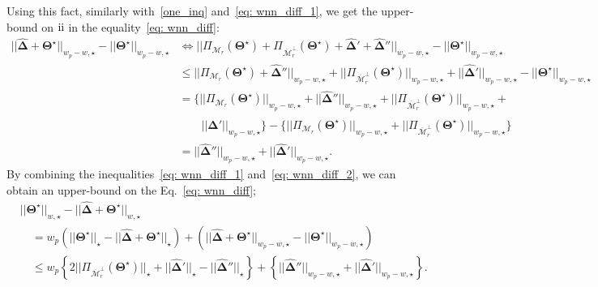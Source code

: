 \documentclass[alpha-refs]{wiley-article}
\newcommand{\RN}[1]{ \textup{\uppercase\expandafter{\romannumeral#1}} }
\begin{document}
Using this fact, similarly with~\eqref{one_inq} and~\eqref{eq: wnn_diff_1}, we get the upper-bound on $\RN{2}$ in the equality~\eqref{eq: wnn_diff}:
\begin{align}
||\boldsymbol{\widehat{\Delta}} + \boldsymbol{\Theta^{\star}}||_{w_{p} - w, \star} -  ||\boldsymbol{\Theta^{\star}}||_{w_{p} - w, \star}
 & \Leftrightarrow  ||\Pi_{\mathcal{M}_{r}}(\boldsymbol{\Theta^{\star}}) + \Pi_{\overline{\mathcal{M}}_{r}^{\perp}}(\boldsymbol{\Theta^{\star}}) + \boldsymbol{\widehat{\Delta}}' + \boldsymbol{\widehat{\Delta}}''||_{w_{p} - w, \star} - ||\boldsymbol{\Theta^{\star}}||_{w_{p} - w, \star} \nonumber\\
 & \leq ||\Pi_{\mathcal{M}_{r}}(\boldsymbol{\Theta^{\star}}) + \boldsymbol{\widehat{\Delta}}''||_{w_{p} - w, \star} + || \Pi_{\overline{\mathcal{M}}_{r}^{\perp}}(\boldsymbol{\Theta^{\star}}) ||_{w_{p} - w, \star} + ||\boldsymbol{\widehat{\Delta}}'||_{w_{p} - w, \star} - ||\boldsymbol{\Theta^{\star}}||_{w_{p} - w, \star} \nonumber\\
 & = \bigg\{ ||\Pi_{\mathcal{M}_{r}}(\boldsymbol{\Theta^{\star}})||_{w_{p} - w, \star} + || \boldsymbol{\widehat{\Delta}}''||_{w_{p} - w, \star}  + || \Pi_{\overline{\mathcal{M}}_{r}^{\perp}}(\boldsymbol{\Theta^{\star}}) ||_{w_{p} - w, \star} + \nonumber\\
 & \qquad ||\boldsymbol{\widehat{\Delta}}' ||_{w_{p} - w, \star} \bigg\}  - \bigg\{ ||\Pi_{\mathcal{M}_{r}}(\boldsymbol{\Theta^{\star}})||_{w_{p} - w, \star} + || \Pi_{\overline{\mathcal{M}}_{r}^{\perp}}(\boldsymbol{\Theta^{\star}}) ||_{w_{p} - w, \star} \bigg\} \nonumber\\
 & = ||\boldsymbol{\widehat{\Delta}}''||_{w_{p} - w, \star}  + ||\boldsymbol{\widehat{\Delta}}'||_{w_{p} - w, \star}. \label{eq: wnn_diff_2}
\end{align}
By combining the inequalities~\eqref{eq: wnn_diff_1} and~\eqref{eq: wnn_diff_2}, we can obtain an upper-bound on the Eq.~\eqref{eq: wnn_diff};
\begin{align}
    &||\boldsymbol{\Theta^{\star}}||_{w,\star} - ||\boldsymbol{\widehat{\Delta}} + \boldsymbol{\Theta^{\star}}||_{w,\star} \nonumber \\
    &\quad =   w_{p}(||\boldsymbol{\Theta^{\star}}||_{\star} - ||\boldsymbol{\widehat{\Delta}} + \boldsymbol{\Theta^{\star}}||_{\star}) + (||\boldsymbol{\widehat{\Delta}} + \boldsymbol{\Theta^{\star}}||_{w_{p}-w,\star} - ||\boldsymbol{\Theta^{\star}}||_{w_{p}-w,\star} )  \nonumber\\
    &\quad \leq  w_{p}\left\lbrace 2||\Pi_{\overline{\mathcal{M}}_{r}^{\perp}}(\boldsymbol{\Theta^{\star}})||_{\star} + ||\boldsymbol{\widehat{\Delta}}'||_{\star} - ||\boldsymbol{\widehat{\Delta}}''||_{\star}  \right\rbrace + \left\lbrace ||\boldsymbol{\widehat{\Delta}}''||_{w_{p} - w, \star}  + ||\boldsymbol{\widehat{\Delta}}'||_{w_{p} - w, \star}\right\rbrace.\nonumber
\end{align}
\end{document}
